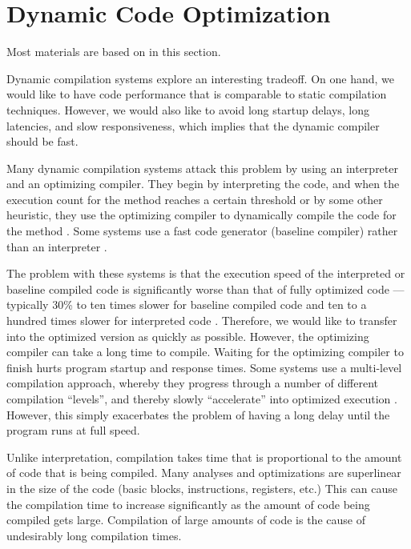 \newpage

\section{Dynamic Code Optimization}

Most materials are based on \cite{whaley2001partial} in this section.

Dynamic compilation systems explore an interesting tradeoff. On one hand, we would like to have code performance
that is comparable to static compilation techniques. However, we would also like to avoid long startup delays, long
latencies, and slow responsiveness, which implies that the
dynamic compiler should be fast.

Many dynamic compilation systems attack this problem by
using an interpreter and an optimizing compiler. They begin
by interpreting the code, and when the execution count for
the method reaches a certain threshold or by some other
heuristic, they use the optimizing compiler to dynamically
compile the code for the method\cite{suganuma2000overview,paleczny2001java} . Some systems
use a fast code generator (baseline compiler) rather than an
interpreter \cite{burke1999jalapeno, cierniak2000practicing}.

The problem with these systems is that the execution speed
of the interpreted or baseline compiled code is significantly
worse than that of fully optimized code — typically 30\% to
ten times slower for baseline compiled code \cite{burke1999jalapeno, cierniak2000practicing} and ten
to a hundred times slower for interpreted code \cite{suganuma2000overview,paleczny2001java}.
Therefore, we would like to transfer into the optimized version as quickly as possible. However, the optimizing compiler can take a long time to compile. Waiting for the optimizing compiler to finish hurts program startup and response times. Some systems use a multi-level compilation
approach, whereby they progress through a number of different compilation “levels”, and thereby slowly “accelerate”
into optimized execution \cite{paleczny2001java,suganuma2001dynamic}. However, this simply
exacerbates the problem of having a long delay until the
program runs at full speed.

Unlike interpretation, compilation takes time that is proportional to the amount of code that is being compiled. Many
analyses and optimizations are superlinear in the size of the
code (basic blocks, instructions, registers, etc.) This can
cause the compilation time to increase significantly as the
amount of code being compiled gets large. Compilation of
large amounts of code is the cause of undesirably long compilation times.


